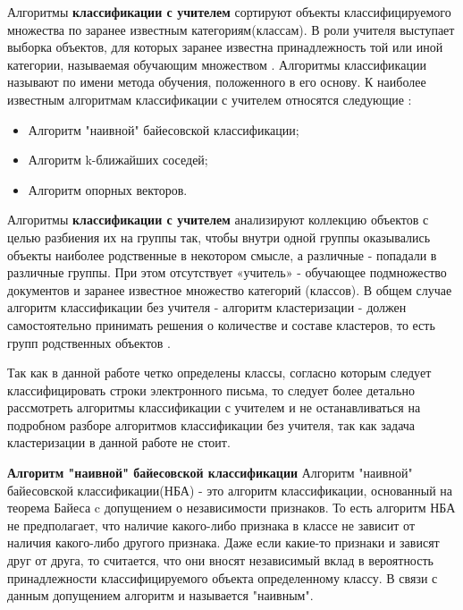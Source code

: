 Алгоритмы \textbf{классификации с учителем} сортируют объекты классифицируемого множества по заранее известным категориям(классам). В роли учителя выступает выборка объектов, для которых заранее известна принадлежность той или иной категории, называемая обучающим множеством \cite{Posobie}. 
Алгоритмы классификации называют по имени метода обучения, положенного в его основу. К наиболее известным алгоритмам классификации с учителем относятся следующие \cite{Posobie}:
\begin{itemize}
	\item Алгоритм "наивной" байесовской классификации;
	\item Алгоритм k-ближайших соседей;
	\item Алгоритм опорных векторов.
\end{itemize}

Алгоритмы \textbf{классификации с учителем} анализируют
коллекцию объектов с целью разбиения их на группы так, чтобы внутри одной группы оказывались объекты наиболее родственные в некотором смысле, а различные - попадали в различные группы. При этом отсутствует «учитель» - обучающее подмножество документов и заранее известное множество категорий (классов). В общем случае алгоритм классификации без учителя - алгоритм кластеризации - должен самостоятельно принимать решения о количестве и составе кластеров, то есть групп родственных объектов \cite{Posobie}.

Так как в данной работе четко определены классы, согласно которым следует классифицировать строки электронного письма, то следует более детально рассмотреть алгоритмы классификации с учителем и не останавливаться на подробном разборе алгоритмов классификации без учителя, так как задача кластеризации в данной работе не стоит.

\vspace{\baselineskip}
\textbf{Алгоритм "наивной" байесовской классификации}
Алгоритм "наивной" байесовской классификации(НБА) - это алгоритм классификации, основанный на теорема Байеса \cite{Bayes} c допущением о независимости признаков. То есть алгоритм НБА не предполагает, что наличие какого-либо признака в классе не зависит от наличия какого-либо другого признака. Даже если какие-то признаки и зависят друг от друга, то считается, что они вносят независимый вклад в вероятность принадлежности классифицируемого объекта определенному классу. В связи с данным допущением алгоритм и называется "наивным". 


